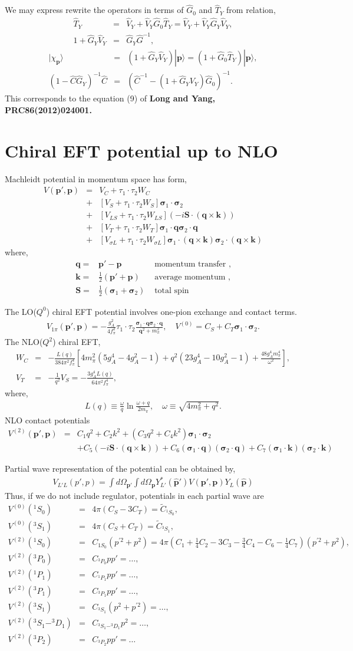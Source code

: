\documentclass[10pt]{article}
\def\bm{\boldsymbol}
\newcommand{\bea}{\begin{eqnarray}}
\newcommand{\eea}{\end{eqnarray}}
\newcommand{\no}{\nonumber \\}
\def\vs{{\bm \sigma}}
\def\vp{{\bm p}}
\def\vq{{\bm q}}
\def\vk{{\bm k}}
\def\ra{\rangle}
\begin{document}
We may express rewrite the operators in terms of $\hat{G}_0$ and $\hat{T}_Y$ from relation,
\bea
\hat{T}_Y&=&\hat{V}_Y+\hat{V}_Y\hat{G}_0\hat{T}_Y
         =\hat{V}_Y+\hat{V}_Y\hat{G}_Y\hat{V}_Y, \no 
1+\hat{G}_Y\hat{V}_Y&=& \hat{G}_Y\hat{G}^{-1},
\eea
\bea
|\chi_\vp\ra&=&(1+\hat{G}_Y\hat{V}_Y)|\vp\ra
            =(1+\hat{G}_0\hat{T}_Y)|\vp\ra,\no
(1-\hat{C}\hat{G}_Y)^{-1}\hat{C}
&=&(\hat{C}^{-1}-(1+\hat{G}_YV_Y)\hat{G}_0)^{-1}.             
\eea
This corresponds to the equation (9) of {\bf 
Long and Yang, PRC86(2012)024001.}

\section{Chiral EFT potential up to NLO}
Machleidt potential in momentum space has form,
\bea 
V(\vp',\vp)&=&V_C+\tau_1\cdot\tau_2 W_C\no
           &+&\left[V_S+\tau_1\cdot\tau_2 W_S\right]\vs_1\cdot\vs_2\no 
           &+&\left[V_{LS}+\tau_1\cdot\tau_2 W_{LS}\right]
           (-i{\bm S}\cdot(\vq\times\vk))  \no 
           &+&\left[V_T+\tau_1\cdot\tau_2 W_T\right]
           \vs_1\cdot\vq \vs_2\cdot\vq \no 
           &+& \left[V_{\sigma L}+\tau_1\cdot\tau_2 W_{\sigma L}\right]
           \vs_1\cdot(\vq\times\vk )\vs_2\cdot(\vq\times\vk ) 
\eea  
where,
\bea 
\vq=&\vp'-\vp                    & \mbox{ momentum transfer } ,\no 
\vk=&\frac{1}{2}(\vp'+\vp)       & \mbox{ average momentum } ,\no
{\bm S}=&\frac{1}{2}(\vs_1+\vs_2) & \mbox{ total spin } 
\eea 

The LO($Q^0$) chiral EFT potential involves one-pion exchange and 
contact terms. 
\bea
V_{1\pi}(\vp',\vp)=-\frac{g_A^2}{4f_\pi^2}
 \tau_1\cdot\tau_2
 \frac{\vs_1\cdot\vq \vs_2\cdot\vq}{\vq^2+m_\pi^2},
 \quad V^{(0)}=C_S+C_T\vs_1\cdot \vs_2.  
\eea
The NLO($Q^2$) chiral EFT,
\bea 
W_C&=&-\frac{L(q)}{384\pi^2 f_\pi^4}
     \left[ 4m_\pi^2(5 g_A^4-4 g_A^2-1)
            +q^2(23 g_A^4-10 g_A^2-1)
            +\frac{48 g_A^4 m_\pi^4}{\omega^2} 
     \right],\no 
V_T&=& -\frac{1}{q^2} V_S=-\frac{3 g_A^4 L(q)}{64\pi^2 f_\pi^4},   
\eea 
where,
\bea 
L(q)\equiv \frac{\omega}{q}\ln \frac{\omega+q}{2m_\pi},
\quad \omega\equiv \sqrt{4 m_\pi^2+q^2}.
\eea 
NLO contact potentials
\bea 
V^{(2)}(\vp',\vp )
&=& C_1q^2+ C_2 k^2
+(C_3 q^2+ C_4 k^2)\vs_1\cdot\vs_2 \no & & 
+C_5(-i{\bm S}\cdot (\vq\times\vk ))
+C_6(\vs_1\cdot\vq )
    (\vs_2\cdot\vq )
+C_7(\vs_1\cdot\vk )(\vs_2\cdot\vk )      
\eea 

Partial wave representation of the potential can be obtained by,
\bea 
V_{L'L}(p',p)=\int d\Omega_{\vp'}\int d\Omega_{\vp}
             Y^*_{L'}(\hat{\vp}') V(\vp',\vp)
             Y_{L}(\hat{\vp})
\eea 
Thus, if we do not include regulator, potentials in each partial wave
are 
\bea 
V^{(0)}(^1S_0)&=& 4\pi (C_S-3C_T)=\widetilde{C}_{^1S_0},\no 
V^{(0)}(^3S_1)&=& 4\pi (C_S+C_T)=\widetilde{C}_{^3S_1},\no 
V^{(2)}(^1S_0)&=& C_{1S_0} (p^{'2}+p^2)
               =4\pi (C_1+\frac{1}{4}C_2-3C_3-\frac{3}{4}C_4
                -C_6-\frac{1}{4}C_7 )(p^{'2}+p^2),\no 
V^{(2)}(^3P_0)&=& C_{^3P_0} p p'=\dots,\no 
V^{(2)}(^1P_1)&=& C_{^1P_1}pp'=\dots,\no
V^{(2)}(^3P_1)&=& C_{^3P_1}pp'=\dots,\no
V^{(2)}(^3S_1)&=& C_{^3S_1}(p^2+p^{'2})=\dots,\no
V^{(2)}(^3S_1-^3D_1)
&=& C_{^3S_1-^3D_1} p^2=\dots,\no 
V^{(2)}(^3P_2)&=& C_{^3P_2}p p'=\dots                  
\eea 
\end{document}

